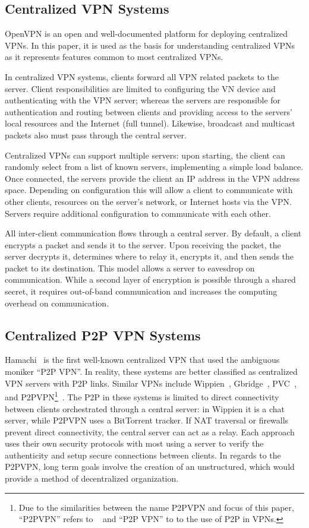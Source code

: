 \subsection{Centralized VPN Systems}
OpenVPN is an open and well-documented platform for deploying centralized VPNs.
In this paper, it is used as the basis for understanding centralized VPNs as it
represents features common to most centralized VPNs.

In centralized VPN systems, clients forward all VPN related packets to the
server.  Client responsibilities are limited to configuring the VN device and
authenticating with the VPN server; whereas the servers are responsible for
authentication and routing between clients and providing access to the servers'
local resources and the Internet (full tunnel).  Likewise, broadcast and
multicast packets also must pass through the central server.

Centralized VPNs can support multiple servers: upon starting, the client can
randomly select from a list of known servers, implementing a simple load
balance.  Once connected, the servers provide the client an IP address in the
VPN address space. Depending on configuration this will allow a client to
communicate with other clients, resources on the server's network,
or Internet hosts via the VPN.  Servers require additional configuration to
communicate with each other.

All inter-client communication flows through a central server.  By default, a
client encrypts a packet and sends it to the server.  Upon receiving the packet,
the server decrypts it, determines where to relay it, encrypts it, and then
sends the packet to its destination.  This model allows a server to eavesdrop on
communication.  While a second layer of encryption is possible through a shared
secret, it requires out-of-band communication and increases the computing
overhead on communication.


\subsection{Centralized P2P VPN Systems}
Hamachi~\cite{hamachi} is the first well-known centralized VPN that used the
ambiguous moniker ``P2P VPN''.  In reality, these systems are better classified
as centralized VPN servers with P2P links.  Similar VPNs include
Wippien~\cite{wippien}, Gbridge~\cite{gbridge}, PVC~\cite{pvc}, and
P2PVPN\footnote{Due to the similarities between the name P2PVPN and focus of
this paper, ``P2PVPN'' refers to ~\cite{p2pvpn} and ``P2P VPN'' to to the use
of P2P in VPNs.}~\cite{p2pvpn}.  The P2P in these systems is limited to direct
connectivity between clients orchestrated through a central server: in Wippien
it is a chat server, while P2PVPN uses a BitTorrent tracker.  If NAT traversal
or firewalls prevent direct connectivity, the central server can act as a
relay.  Each approach uses their own security protocols with most using a
server to verify the authenticity and setup secure connections between clients.
In regards to the P2PVPN, long term goals involve the creation of an
unstructured, which would provide a method of decentralized organization.

